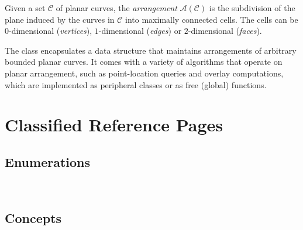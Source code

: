\label{chapterArrangement_2_ref}

Given a set $\mathcal{C}$ of planar curves, the {\em arrangement}
${\mathcal A}({\mathcal C})$ is the subdivision of the plane induced
by the curves in $\mathcal{C}$ into maximally connected cells. The cells
can be $0$-dimensional ({\em vertices}), $1$-dimensional ({\em edges})
or $2$-dimensional ({\em faces}).

The class  encapsulates a data structure
that maintains arrangements of arbitrary bounded planar curves. It comes
with a variety of algorithms that operate on planar arrangement,
such as point-location queries and overlay computations, which are
implemented as peripheral classes or as free (global) functions.

\section{Classified Reference Pages}

\subsection*{Enumerations}

\\

\subsection*{Concepts}

